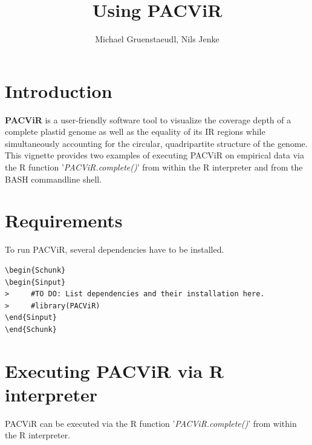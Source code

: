\documentclass[letterpaper]{article}
\author{Michael Gruenstaeudl, Nils Jenke}
\title{Using PACViR}
\begin{document}



\maketitle

\tableofcontents

\section{Introduction}

  \textbf{PACViR} is a user-friendly software tool to visualize the coverage depth of a complete plastid genome as well as the equality of its IR regions while simultaneously accounting for the circular, quadripartite structure of the genome. This vignette provides two examples of executing PACViR on empirical data via the R function '\textit{PACViR.complete()}' from within the R interpreter and from the BASH commandline shell.

\section{Requirements}

  To run PACViR, several dependencies have to be installed.


  \begin{footnotesize}
  \begin{lstlisting}[linerange=\\begin\{Sinput\}-\\end\{Sinput\},includerangemarker=false]
\begin{Schunk}
\begin{Sinput}
>     #TO DO: List dependencies and their installation here.
>     #library(PACViR)
\end{Sinput}
\end{Schunk}
  \end{lstlisting}
  \end{footnotesize}

\pagebreak

\section{Executing PACViR via R interpreter}
PACViR can be executed via the R function '\textit{PACViR.complete()}' from within the R interpreter.
\end{document}
